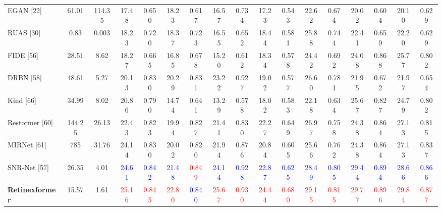 \documentclass{article}
\begin{document}
\begin{table}[ht]
\begin{adjustbox}{width=\textwidth}
\begin{tabular}{l|cc|cc|cc|cc|cc|cc|cc|cc}
                EGAN [22] & 61.01 & {114.35} & 17.48 & 0.650 & 18.23 & 0.617 & 16.57 & 0.734 & 17.23 & 0.543 & 22.62 & 0.674 & 20.02 & 0.604 & 20.10 & 0.629 \\
                RUAS [30] & 0.83 & 0.003 & 18.23 & 0.720 & 18.37 & 0.723 & 16.55 & 0.652 & 18.44 & 0.581 & 25.88 & 0.744 & 22.41 & 0.659 & 22.20 & 0.629 \\
                FIDE [56] & 28.51 & 8.62 & 18.27 & 0.665 & 16.85 & 0.678 & 15.20 & 0.612 & 18.34 & 0.578 & 24.42 & 0.692 & 24.08 & 0.868 & 25.77 & 0.802 \\
                DRBN [58] & 48.61 & 5.27 & 20.13 & {0.830} & 20.29 & {0.831} & {23.22} & {0.927} & 19.02 & 0.577 & 26.60 & 0.781 & 21.95 & 0.672 & 21.97 & 0.654 \\
                Kind [66] & 34.99 & 8.02 & 20.86 & {0.790} & 14.74 & 0.641 & 13.29 & 0.578 & 18.02 & 0.583 & 22.18 & 0.634 & {25.67} & 0.827 & 24.79 & 0.802 \\
                Restormer [60] & 144.25 & 26.13 & 22.43 & {0.823} & 19.94 & {0.827} & 21.41 & {0.830} & {22.27} & 0.649 & 26.97 & 0.758 & 24.38 & 0.864 & 27.13 & 0.815 \\
                MIRNet [61] & 785 & 31.76 & 24.14 & 0.830 & 20.02 & 0.820 & 21.94 & 0.876 & 20.84 & 0.605 & 25.66 & 0.762 & 24.38 & 0.864 & 27.13 & 0.837 \\
                SNR-Net [57] & {26.35} & {4.01} & 
                \textcolor{blue}{24.61} & \textcolor{blue}{0.842} & \textcolor{blue}{21.48} & \textcolor{red}{0.849} & \textcolor{blue}{24.14} & \textcolor{blue}{0.928} & \textcolor{blue}{22.87} & \textcolor{blue}{0.625} & \textcolor{blue}{28.49} & \textcolor{blue}{0.805} & \textcolor{blue}{29.44} & \textcolor{blue}{0.894} & \textcolor{blue}{28.66} & \textcolor{blue}{0.866} \\
                \hline
                \textbf{Retinexformer} & {15.57} & {1.61}  & 
                \textcolor{red}{25.16} & \textcolor{red}{0.845} & \textcolor{red}{22.80} & \textcolor{blue}{0.840} & \textcolor{red}{25.67} & \textcolor{red}{0.930} & \textcolor{red}{24.44} & \textcolor{red}{0.680} & \textcolor{red}{29.15} & \textcolor{red}{0.815} & \textcolor{red}{29.77} & \textcolor{red}{0.896} & \textcolor{red}{29.84} & \textcolor{red}{0.877} \\
                \bottomrule
            \end{tabular}
        \end{adjustbox}
    \end{table}
    
\end{document}
